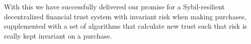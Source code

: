 
With this we have successfully delivered our promise for a Sybil-resilient decentralized financial trust system with
invariant risk when making purchases, supplemented with a set of algorithms that calculate new trust such that risk is
really kept invariant on a purchase.

